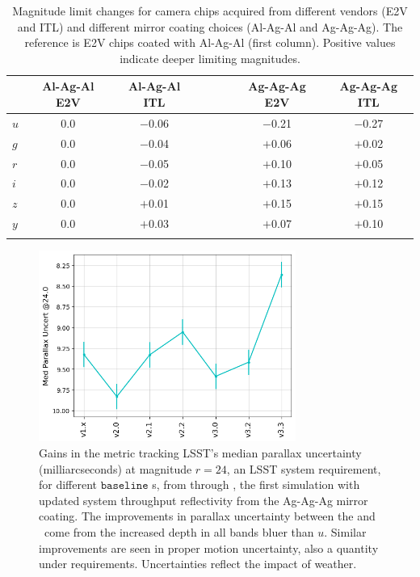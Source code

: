 \begin{longtable}{lccccc}
 \\\hline
& Al-Ag-Al E2V &	Al-Ag-Al ITL & &		Ag-Ag-Ag E2V &		Ag-Ag-Ag ITL\\
\hline
$u$	 &	0.0	 &	$-$0.06 &	$\qquad$ &	$-$0.21 &   $-$0.27\\
$g$	 &	0.0	 &	$-$0.04 &	$\qquad$ &	$+$0.06 &	$+$0.02\\
$r$	 &	0.0	 &	$-$0.05 &	$\qquad$ &   $+$0.10 &	$+$0.05\\
$i$	 &	0.0	 &	$-$0.02 &	$\qquad$ &	$+$0.13 &	$+$0.12\\
$z$	 &	0.0	 &	$+$0.01  &	$\qquad$ &	$+$0.15  &	$+$0.15\\
$y$	 &	0.0	 &	$+$0.03  &	$\qquad$ &	$+$0.07  &	$+$0.10\\
\caption{\small{Magnitude limit changes for camera chips acquired from different vendors (E2V and ITL) and different mirror coating choices (Al-Ag-Al and Ag-Ag-Ag). The reference is E2V chips coated with Al-Ag-Al (first column). Positive values indicate deeper limiting magnitudes.
}}\label{tab:dm5Agx3}
\end{longtable}

\begin{figure}[!h]
    \centering    \includegraphics[width=0.75\textwidth]{figures/parallax.png}
\caption{Gains in the metric tracking LSST's median parallax uncertainty (milliarcseconds) at magnitude $r=24$, an LSST  system requirement, for different $\texttt{baseline}$ \opsim s, from  through , the first simulation with updated system throughput  reflectivity from the Ag-Ag-Ag mirror coating. The improvements in parallax uncertainty between the  and  \opsim\ come from the increased depth in all bands bluer than $u$. Similar improvements are seen in proper motion uncertainty, also a quantity under  requirements. Uncertainties reflect the impact of weather.}
\label{fig:parallax}
\end{figure}





